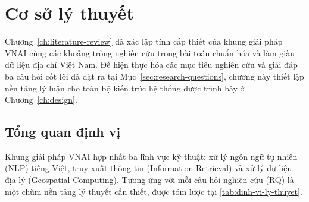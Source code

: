 %
%

\chapter{Cơ sở lý thuyết}
\label{ch:co-so-ly-thuyet}

Chương~\ref{ch:literature-review} đã xác lập tính cấp thiết của khung giải pháp VNAI cùng các khoảng trống nghiên cứu trong bài toán chuẩn hóa và làm giàu dữ liệu địa chỉ Việt Nam. Để hiện thực hóa các mục tiêu nghiên cứu và giải đáp ba câu hỏi cốt lõi đã đặt ra tại Mục~\ref{sec:research-questions}, chương này thiết lập nền tảng lý luận cho toàn bộ kiến trúc hệ thống được trình bày ở Chương~\ref{ch:design}.

\section{Tổng quan định vị}
\label{sec:dinh-vi}

Khung giải pháp VNAI hợp nhất ba lĩnh vực kỹ thuật: xử lý ngôn ngữ tự nhiên (NLP) tiếng Việt, truy xuất thông tin (Information Retrieval) và xử lý dữ liệu địa lý (Geospatial Computing). Tương ứng với mỗi câu hỏi nghiên cứu (RQ) là một chùm nền tảng lý thuyết cần thiết, được tóm lược tại \cref{tab:dinh-vi-ly-thuyet}.


